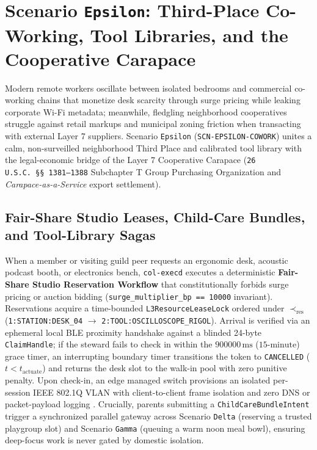 \section{Scenario \texttt{Epsilon}: Third-Place Co-Working, Tool Libraries, and the Cooperative Carapace}
\label{sec:scn-epsilon}

Modern remote workers oscillate between isolated bedrooms and commercial co-working chains that monetize
desk scarcity through surge pricing while leaking corporate Wi-Fi metadata; meanwhile, fledgling
neighborhood cooperatives struggle against retail markups and municipal zoning friction when transacting
with external Layer 7 suppliers. Scenario \texttt{Epsilon} (\texttt{SCN-EPSILON-COWORK}) unites a calm,
non-surveilled neighborhood Third Place and calibrated tool library with the legal-economic bridge of the
Layer 7 Cooperative Carapace (\texttt{26 U.S.C.\ \S\S~1381--1388} Subchapter T Group Purchasing
Organization and \emph{Carapace-as-a-Service} export settlement).

\subsection{Fair-Share Studio Leases, Child-Care Bundles, and Tool-Library Sagas}

When a member or visiting guild peer requests an ergonomic desk, acoustic podcast booth, or electronics
bench, \texttt{col-execd} executes a deterministic \textbf{Fair-Share Studio Reservation Workflow} that
constitutionally forbids surge pricing or auction bidding (\texttt{surge\_multiplier\_bp == 10000}
invariant). Reservations acquire a time-bounded \texttt{L3ResourceLeaseLock} ordered under
$\prec_{\mathrm{res}}$ (\texttt{1:STATION:DESK\_04} $\to$ \texttt{2:TOOL:OSCILLOSCOPE\_RIGOL}). Arrival is
verified via an ephemeral local BLE proximity handshake against a blinded 24-byte \texttt{ClaimHandle}; if
the steward fails to check in within the $900000\,\mathrm{ms}$ ($15\text{-minute}$) grace timer, an
interrupting boundary timer transitions the token to \texttt{CANCELLED} ($t < t_{\mathrm{actuate}}$) and
returns the desk slot to the walk-in pool with zero punitive penalty. Upon check-in, an edge managed
switch provisions an isolated per-session IEEE 802.1Q VLAN with client-to-client frame isolation and zero
DNS or packet-payload logging \parencite{rose2020zero}. Crucially, parents submitting a
\texttt{ChildCareBundleIntent} trigger a synchronized parallel gateway across Scenario \texttt{Delta}
(reserving a trusted playgroup slot) and Scenario \texttt{Gamma} (queuing a warm noon meal bowl), ensuring
deep-focus work is never gated by domestic isolation.

